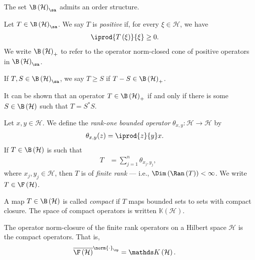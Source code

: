 The set $\B\left(\mathcal{H}\right)_{\sa}$ admits an order structure.
\begin{definition}\label{def:positive_operators}
  Let $T\in \B\left(\mathcal{H}\right)_{\sa}$. We say $T$ is \textit{positive} if, for every $\xi\in \mathcal{H}$, we have
  \begin{align*}
    \iprod{T\left(\xi\right)}{\xi} &\geq 0.
  \end{align*}
  We write $\B\left(\mathcal{H}\right)_{+}$ to refer to the operator norm-closed cone of positive operators in $\B\left(\mathcal{H}\right)_{\sa}$.\newline

  If $T,S\in \B\left(\mathcal{H}\right)_{\sa}$, we say $T\geq S$ if $T-S \in \B\left(\mathcal{H}\right)_{+}$.
\end{definition}
\begin{remark}\label{rem:positive_operators_definition}
  It can be shown that an operator $T\in \B\left(\mathcal{H}\right)_{+}$ if and only if there is some $S\in \B\left(\mathcal{H}\right)$ such that $T = S^{\ast}S$.
\end{remark}
\begin{definition}\label{def:rank_one_bounded_operator}
  Let $x,y\in \mathcal{H}$. We define the \textit{rank-one bounded operator} $\theta_{x,y}\colon \mathcal{H}\rightarrow \mathcal{H}$ by
  \begin{align*}
    \theta_{x,y}(z) &= \iprod{z}{y}x.
  \end{align*}
  If $T\in \B\left(\mathcal{H}\right)$ is such that
  \begin{align*}
    T &= \sum_{j=1}^{n}\theta_{x_j,y_j},
  \end{align*}
  where $x_j,y_j\in \mathcal{H}$, then $T$ is of \textit{finite rank} --- i.e., $\Dim\left(\Ran\left(T\right)\right) < \infty$. We write $T\in \F\left(\mathcal{H}\right)$.\newline

  A map $T\in \B\left(\mathcal{H}\right)$ is called \textit{compact} if $T$ maps bounded sets to sets with compact closure. The space of compact operators is written $\mathbb{K}\left(\mathcal{H}\right)$.
\end{definition}
\begin{theorem}
  The operator norm-closure of the finite rank operators on a Hilbert space $\mathcal{H}$ is the compact operators. That is,
  \begin{align*}
    \overline{\F\left(\mathcal{H}\right)}^{\norm{\cdot}_{\op}} &= \mathbb{K}\left(\mathcal{H}\right).
  \end{align*}
\end{theorem}
